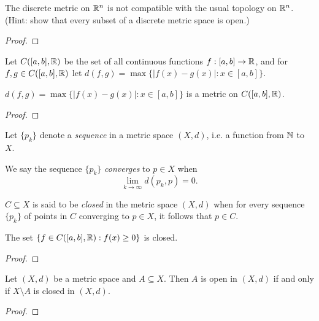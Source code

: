 \documentclass[letterpaper, twoside, 12pt]{book}
\begin{document}
\begin{theorem}
  The discrete metric on \(\mathbb R^n\) is not compatible with the usual
  topology on \(\mathbb R^n\). (Hint: show that every subset of a discrete
  metric space is open.)
\end{theorem}
\begin{proof}

\end{proof}

\begin{definition}
  Let \(C([a,b],\mathbb R)\) be the set of all continuous functions
  \(f:[a,b]\to\mathbb R\), and for \(f,g\in C([a,b],\mathbb R)\) let
  \(d(f,g)=\max\{|f(x)-g(x)|:x\in[a,b]\}\).
\end{definition}

\begin{theorem}[12.3]
  \(d(f,g)=\max\{|f(x)-g(x)|:x\in[a,b]\}\) is a metric on \(C([a,b],\mathbb R)\).
\end{theorem}
\begin{proof}

\end{proof}

\begin{definition}
  Let \(\{p_k\}\) denote a \textit{sequence} in a metric space \((X,d)\),
  i.e. a function from \(\mathbb N\) to \(X\).
\end{definition}

\begin{definition}
  We say the sequence \(\{p_k\}\) \textit{converges} to \(p\in X\)
  when \[\lim_{k\to\infty}d(p_k,p)=0.\]
\end{definition}

\begin{definition}
  \(C\subseteq X\) is said to be \textit{closed} in the metric space
  \((X,d)\) when for every sequence \(\{p_k\}\) of points in \(C\)
  converging to \(p\in X\), it follows that \(p\in C\).
\end{definition}

\begin{example}[12.11]
  The set \(\{f\in C([a,b],\mathbb R):f(x)\geq 0\}\) is closed.
\end{example}
\begin{proof}

\end{proof}

\begin{theorem}
  Let \((X,d)\) be a metric space and \(A\subseteq X\). Then \(A\) is
  open in \((X,d)\) if and only if \(X\setminus A\) is closed in \((X,d)\).
\end{theorem}
\begin{proof}

\end{proof}
\end{document}

